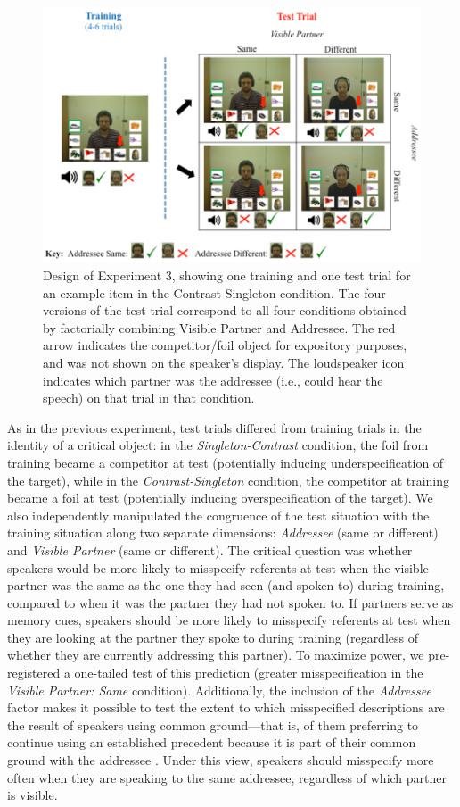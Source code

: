 \documentclass[natbib,doc,a4paper]{apa6}
\begin{document}
\begin{figure}[htbp]
\centering
\includegraphics[width=.9\linewidth]{figs/Exp3_overview.png}
\caption{\label{fig:org22e467a}
Design of Experiment 3, showing one training and one test trial for an example item in the Contrast-Singleton condition. The four versions of the test trial correspond to all four conditions obtained by factorially combining Visible Partner and Addressee. The red arrow indicates the competitor/foil object for expository purposes, and was not shown on the speaker's display.  The loudspeaker icon indicates which partner was the addressee (i.e., could hear the speech) on that trial in that condition.}
\end{figure}

As in the previous experiment, test trials differed from training trials in the identity of a critical object: in the \emph{Singleton-Contrast} condition, the foil from training became a competitor at test (potentially inducing underspecification of the target), while in the \emph{Contrast-Singleton} condition, the competitor at training became a foil at test (potentially inducing overspecification of the target). We also independently manipulated the congruence of the test situation with the training situation along two separate dimensions: \emph{Addressee} (same or different) and \emph{Visible Partner} (same or different). The critical question was whether speakers would be more likely to misspecify referents at test when the visible partner was the same as the one they had seen (and spoken to) during training, compared to when it was the partner they had not spoken to.  If partners serve as memory cues, speakers should be more likely to misspecify referents at test when they are looking at the partner they spoke to during training (regardless of whether they are currently addressing this partner). To maximize power, we pre-registered a one-tailed test of this prediction (greater misspecification in the \emph{Visible Partner: Same} condition).  Additionally, the inclusion of the \emph{Addressee} factor makes it possible to test the extent to which misspecified descriptions are the result of speakers using common ground---that is, of them preferring to continue using an established precedent because it is part of their common ground with the addressee \citep{brennanclark96}. Under this view, speakers should misspecify more often when they are speaking to the same addressee, regardless of which partner is visible.
\end{document}
